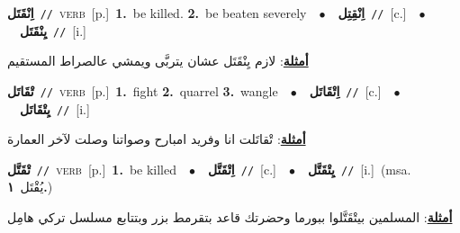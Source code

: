 \documentclass[10pt,a4paper,twoside]{article} %
\begin{document}
\begin{multicols}{2}
{\setlength\topsep{0pt}\textbf{\foreignlanguage{arabic}{اِنْقَتَل}}\ {\color{gray}\texttt{//}\color{black}}\ \textsc{verb}\ [p.]\ \textbf{1.}~be killed.  \textbf{2.}~be beaten severely\ \ $\bullet$\ \ \setlength\topsep{0pt}\textbf{\foreignlanguage{arabic}{اِنْقِتِل}}\ {\color{gray}\texttt{//}\color{black}}\ [c.]\ \ $\bullet$\ \ \setlength\topsep{0pt}\textbf{\foreignlanguage{arabic}{يِنْقَتَل}}\ {\color{gray}\texttt{//}\color{black}}\ [i.]\  \begin{flushright}\color{gray}\foreignlanguage{arabic}{\textbf{\underline{\foreignlanguage{arabic}{أمثلة}}}: لازم يِنْقَتَل عشان يتربَّى ويمشي عالصراط المستقيم}\end{flushright}\color{black}} \vspace{2mm}

{\setlength\topsep{0pt}\textbf{\foreignlanguage{arabic}{تْقَاتَل}}\ {\color{gray}\texttt{//}\color{black}}\ \textsc{verb}\ [p.]\ \textbf{1.}~fight  \textbf{2.}~quarrel  \textbf{3.}~wangle\ \ $\bullet$\ \ \setlength\topsep{0pt}\textbf{\foreignlanguage{arabic}{اِتْقَاتَل}}\ {\color{gray}\texttt{//}\color{black}}\ [c.]\ \ $\bullet$\ \ \setlength\topsep{0pt}\textbf{\foreignlanguage{arabic}{يِتْقَاتَل}}\ {\color{gray}\texttt{//}\color{black}}\ [i.]\  \begin{flushright}\color{gray}\foreignlanguage{arabic}{\textbf{\underline{\foreignlanguage{arabic}{أمثلة}}}: تْقاتَلت انا وفريد امبارح وصواتنا وصلت لآخر العمارة}\end{flushright}\color{black}} \vspace{2mm}

{\setlength\topsep{0pt}\textbf{\foreignlanguage{arabic}{تْقَتَّل}}\ {\color{gray}\texttt{//}\color{black}}\ \textsc{verb}\ [p.]\ \textbf{1.}~be killed\ \ $\bullet$\ \ \setlength\topsep{0pt}\textbf{\foreignlanguage{arabic}{اِتْقَتَّل}}\ {\color{gray}\texttt{//}\color{black}}\ [c.]\ \ $\bullet$\ \ \setlength\topsep{0pt}\textbf{\foreignlanguage{arabic}{يِتْقَتَّل}}\ {\color{gray}\texttt{//}\color{black}}\ [i.]\ \color{gray}(msa. \foreignlanguage{arabic}{يُقْتَل}~\foreignlanguage{arabic}{\textbf{١.}})\color{black}\  \begin{flushright}\color{gray}\foreignlanguage{arabic}{\textbf{\underline{\foreignlanguage{arabic}{أمثلة}}}: المسلمين بيتْقَتَّلوا ببورما وحضرتك قاعد بتقرمط بزر وبتتابع مسلسل تركي هامِل}\end{flushright}\color{black}} \vspace{2mm}


\end{multicols}
\end{document}
